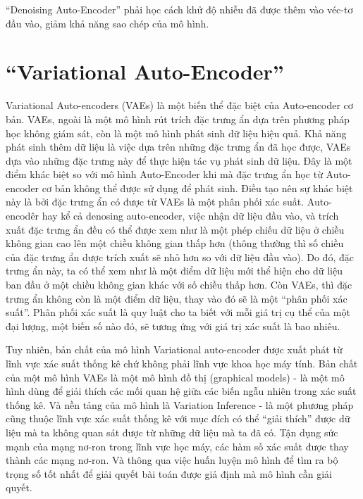     ``Denoising Auto-Encoder'' phải học cách khử độ nhiễu đã được thêm vào véc-tơ đầu vào,
    giảm khả năng sao chép của mô hình.






\section{``Variational Auto-Encoder''} \label{chap2/sec2}
        Variational Auto-encoders (VAEs) là một biến thể đặc biệt của Auto-encoder cơ bản. VAEs, ngoài là một mô hình rút trích đặc trưng ẩn dựa trên phương pháp học không giám sát, còn là một mô hình phát sinh dữ liệu hiệu quả. Khả năng phát sinh thêm dữ liệu là việc dựa trên những đặc trưng ẩn đã học được, VAEs dựa vào những đặc trưng này để thực hiện tác vụ phát sinh dữ liệu. Đây là một điểm khác biệt so với mô hình Auto-Encoder khi mà đặc trưng ẩn học từ Auto-encoder cơ bản không thể được sử dụng để phát sinh. Điều tạo nên sự khác biệt này là bởi đặc trưng ẩn có được từ VAEs là một phân phối xác suất. Auto-encodêr hay kể cả denosing auto-encoder, việc nhận dữ liệu đầu vào, và trích xuất đặc trưng ẩn đều có thể được xem như là một phép chiếu dữ liệu ở chiều không gian cao lên một chiều không gian thấp hơn (thông thường thì số chiều của đặc trưng ẩn dược trích xuất sẽ nhỏ hơn so với dữ liệu đầu vào). Do đó, đặc trưng ẩn này, ta có thể xem như là một điểm dữ liệu mới thể hiện cho dữ liệu ban đầu ở một chiều không gian khác với số chiều thấp hơn. Còn VAEs, thì đặc trưng ẩn không còn là một điểm dữ liệu, thay vào đó sẽ là một ``phân phối xác suất''. Phân phối xác suất là quy luật cho ta biết với mỗi giá trị cụ thể của một đại lượng, một biến số nào đó, sẽ tương ứng với giá trị xác suất là bao nhiêu. 

        Tuy nhiên, bản chất của mô hình Variational auto-encoder được xuất phát từ lĩnh vực xác suất thống kê chứ không phải lĩnh vực khoa học máy tính. Bản chất của một mô hình VAEs là một mô hình đồ thị (graphical models) - là một mô hình dùng để giải thích các mối quan hệ giữa các biến ngẫu nhiên trong xác suất thống kê. Và nền tảng của mô hình là Variation Inference - là một phương pháp cũng thuộc lĩnh vực xác suất thống kê với mục đích có thể ``giải thích'' được dữ liệu mà ta không quan sát được từ những dữ liệu mà ta đã có. Tận dụng sức mạnh của mạng nơ-ron trong lĩnh vực học máy, các hàm số xác suất được thay thành các mạng nơ-ron. Và thông qua việc huấn luyện mô hình để tìm ra bộ trọng số tốt nhất để giải quyết bài toán được giả định mà mô hình cần giải quyết. 

